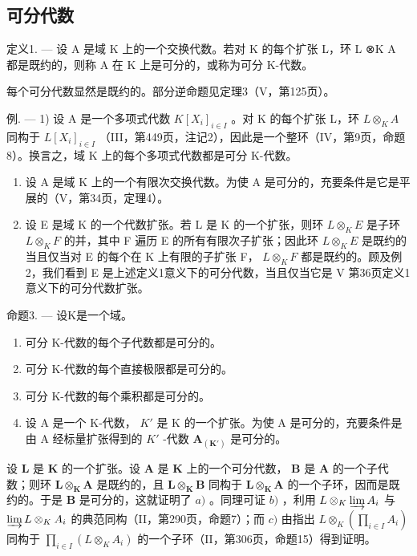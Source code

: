 \subsection{可分代数}

定义1. --- 设 A 是域 K 上的一个交换代数。若对 K 的每个扩张 L，环 L ⊗K A 都是既约的，则称 A 在 K 上是可分的，或称为可分 K-代数。

每个可分代数显然是既约的。部分逆命题见定理3（V，第125页）。

例. --- 1) 设 A 是一个多项式代数 \(K[X_{i}]_{i \in I}\) 。对 K 的每个扩张 L，环 \(L \otimes_{K} A\) 同构于 \(L[X_{i}]_{i \in I}\) （III，第449页，注记2），因此是一个整环（IV，第9页，命题8）。换言之，域 K 上的每个多项式代数都是可分 K-代数。

\begin{enumerate}
\def\labelenumi{\arabic{enumi})}
\setcounter{enumi}{1}
\item
  设 A 是域 K 上的一个有限次交换代数。为使 A 是可分的，充要条件是它是平展的（V，第34页，定理4）。
\item
  设 E 是域 K 的一个代数扩张。若 L 是 K 的一个扩张，则环 \(L \otimes_{K} E\) 是子环 \(L \otimes_{K} F\) 的并，其中 F 遍历 E 的所有有限次子扩张；因此环 \(L \otimes_{K} E\) 是既约的当且仅当对 E 的每个在 K 上有限的子扩张 F， \(L \otimes_{K} F\) 都是既约的。顾及例2，我们看到 E 是上述定义1意义下的可分代数，当且仅当它是 V 第36页定义1意义下的可分代数扩张。
\end{enumerate}

命题3. --- 设K是一个域。

\begin{enumerate}
\def\labelenumi{\alph{enumi})}
\item
  可分 K-代数的每个子代数都是可分的。
\item
  可分 K-代数的每个直接极限都是可分的。
\item
  可分 K-代数的每个乘积都是可分的。
\item
  设 A 是一个 K-代数， \(K'\) 是 K 的一个扩张。为使 A 是可分的，充要条件是由 A 经标量扩张得到的 \(K'\) -代数 \(\mathbf{A}_{(\mathbf{K}')}\) 是可分的。
\end{enumerate}

设 \(\mathbf{L}\) 是 \(\mathbf{K}\) 的一个扩张。设 \(\mathbf{A}\) 是 \(\mathbf{K}\) 上的一个可分代数， \(\mathbf{B}\) 是 \(\mathbf{A}\) 的一个子代数；则环 \(\mathbf{L} \otimes_{\mathbf{K}} \mathbf{A}\) 是既约的，且 \(\mathbf{L} \otimes_{\mathbf{K}} \mathbf{B}\) 同构于 \(\mathbf{L} \otimes_{\mathbf{K}} \mathbf{A}\) 的一个子环，因而是既约的。于是 \(\mathbf{B}\) 是可分的，这就证明了 \(a)\) 。同理可证 \(b)\) ，利用 \(L \otimes_{K} \varinjlim A_i\) 与 \(\varinjlim L \otimes_K A_i\) 的典范同构（II，第290页，命题7）；而 \(c)\) 由指出 \(L \otimes_K \left( \prod_{i \in I} A_i \right)\) 同构于 \(\prod_{i \in I} (L \otimes_K A_i)\) 的一个子环（II，第306页，命题15）得到证明。

